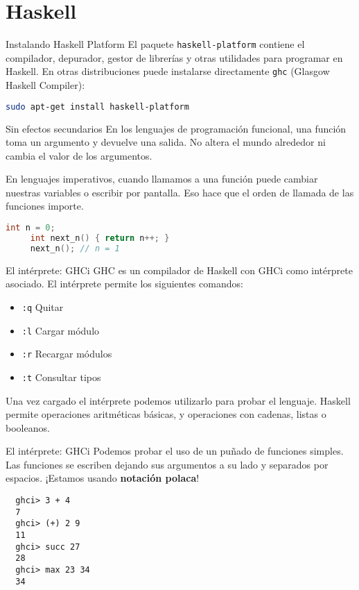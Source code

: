 \section{Haskell}

\begin{frame}[fragile]{Instalando Haskell Platform}
  El paquete \texttt{haskell-platform} contiene el compilador, depurador, gestor de
  librerías y otras utilidades para programar en Haskell.
  En otras distribuciones puede instalarse directamente \texttt{ghc}
  (Glasgow Haskell Compiler):
  \espacio

  \begin{lstlisting}[language=bash]
  sudo apt-get install haskell-platform
  \end{lstlisting}
\end{frame}

\begin{frame}[fragile]{Sin efectos secundarios}
    En los lenguajes de programación funcional, una función toma un argumento y
    devuelve una salida. No altera el mundo alrededor ni cambia el valor de los argumentos.

    \espacio

    En lenguajes imperativos, cuando llamamos a una función puede cambiar nuestras
     variables o escribir por pantalla. Eso hace que el orden de llamada de las
    funciones importe.

    \espacio

  \begin{lstlisting}[language=C++]
     int n = 0;
     int next_n() { return n++; }
     next_n(); // n = 1
  \end{lstlisting}
\end{frame}

\begin{frame}{El intérprete: GHCi}
  GHC es un compilador de Haskell con GHCi como intérprete asociado.
  El intérprete permite los siguientes comandos:
  \begin{itemize}
    \item \texttt{:q} \qquad  Quitar
    \item \texttt{:l} \qquad  Cargar módulo
    \item \texttt{:r} \qquad  Recargar módulos
    \item \texttt{:t} \qquad  Consultar tipos
  \end{itemize}

  Una vez cargado el intérprete podemos utilizarlo para probar el lenguaje.
  Haskell permite operaciones aritméticas básicas, y operaciones con
  cadenas, listas o booleanos.
\end{frame}

\begin{frame}[fragile]{El intérprete: GHCi}
  Podemos probar el uso de un puñado de funciones simples. Las funciones
  se escriben dejando sus argumentos a su lado y separados por espacios. ¡Estamos usando
  \textbf{notación polaca}!

  \begin{lstlisting}
  ghci> 3 + 4
  7
  ghci> (+) 2 9
  11
  ghci> succ 27
  28
  ghci> max 23 34
  34
  \end{lstlisting}
\end{frame}
